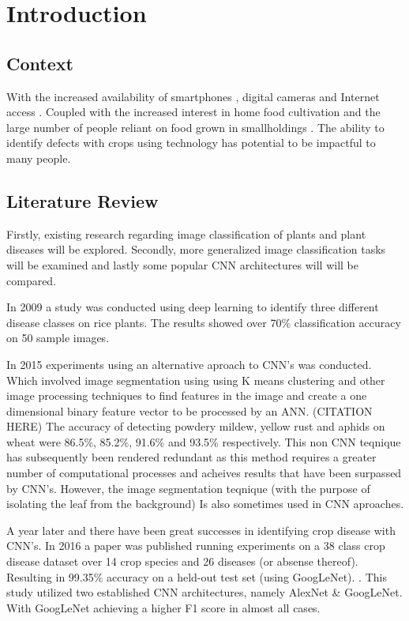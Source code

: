 \chapter{Introduction}
\label{introduction}

\section{Context}
  With the increased availability of smartphones \cite{Statista:2021}, digital cameras \cite{ImarcGroup} and Internet access \cite{Wikipedia} \cite{Globaltt}. Coupled with the increased interest in home food cultivation \cite{Google} and the large number of people reliant on food grown in smallholdings \cite{JLIFADSmallHolders}. The ability to identify defects with crops using technology has potential to be impactful to many people.
\section{Literature Review}
  Firstly, existing research regarding image classification of plants and plant diseases will be
  explored. Secondly, more generalized image classification tasks will be examined and lastly some popular CNN architectures will will be compared.
  \par
  In 2009 a study was conducted using deep learning to identify three different disease classes on rice plants. The results showed over 70\% classification accuracy on 50 sample images. \cite{Anthonys2009}
  \par
  In 2015 experiments using an alternative aproach to CNN's was conducted. Which involved image segmentation
  using using K means clustering and other image processing techniques to find features in the image and create a one dimensional binary feature vector to be processed by an ANN. (CITATION HERE) The accuracy of detecting powdery mildew, yellow rust and aphids on wheat were 86.5\%, 85.2\%, 91.6\% and 93.5\% respectively.
  This non CNN teqnique has subsequently been rendered redundant as this method requires a greater number of
  computational processes and acheives results that have been surpassed by CNN's. However, the image segmentation teqnique (with the purpose of isolating the leaf from the background) Is also sometimes used in CNN aproaches.
  \par
  A year later and there have been great successes in identifying crop disease with CNN's. In 2016 a paper was published running experiments on a 38 class crop disease dataset over 14 crop species and 26 diseases (or absense thereof). Resulting in 99.35\% accuracy on a held-out test set (using GoogLeNet). \cite{Mohanty2016}. This study utilized two established CNN architectures, namely AlexNet \cite{Krizhevsky} & GoogLeNet. \cite{Szegedy_2015_CVPR} With GoogLeNet achieving a higher F1 score in almost all cases.

